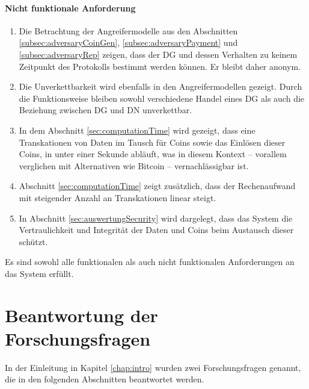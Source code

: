 \documentclass[
	fontsize=11pt,
	headings=small,
	parskip=half,           %
	bibliography=totoc,
	numbers=noenddot,       %
	open=any,               %
]{scrreprt}
\begin{document}
\paragraph{Nicht funktionale Anforderung}
\begin{enumerate}
    \item Die Betrachtung der Angreifermodelle aus den Abschnitten \ref{subsec:adversaryCoinGen}, \ref{subsec:adversaryPayment} und \ref{subsec:adversaryRep} zeigen, dass der DG und dessen Verhalten zu keinem Zeitpunkt des Protokolls bestimmt werden können. Er bleibt daher anonym.
    \item Die Unverkettbarkeit wird ebenfalls in den Angreifermodellen gezeigt. Durch die Funktionsweise bleiben sowohl verschiedene Handel eines DG als auch die Beziehung zwischen DG und DN unverkettbar.
    \item In dem Abschnitt \ref{sec:computationTime} wird gezeigt, dass eine Transkationen von Daten im Tausch für Coins sowie das Einlösen dieser Coins, in unter einer Sekunde abläuft, was in diesem Kontext -- vorallem verglichen mit Alternativen wie Bitcoin -- vernachlässigbar ist.
    \item Abschnitt \ref{sec:computationTime} zeigt zusätzlich, dass der Rechenaufwand mit steigender Anzahl an Transkationen linear steigt.
    \item In Abschnitt \ref{sec:auswertungSecurity} wird dargelegt, dass das System die Vertraulichkeit und Integrität der Daten und Coins beim Austausch dieser schützt.
\end{enumerate}

Es sind sowohl alle funktionalen als auch nicht funktionalen Anforderungen an das System erfüllt.

\section{Beantwortung der Forschungsfragen}
In der Einleitung in Kapitel \ref{chap:intro} wurden zwei Forschungsfragen genannt, die in den folgenden Abschnitten beantwortet werden.
\end{document}
